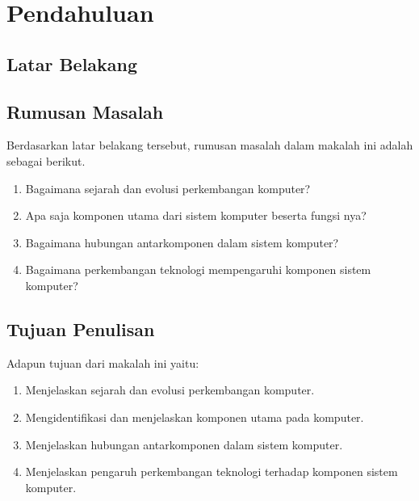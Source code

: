\section{Pendahuluan}

\subsection{Latar Belakang}
\lipsum[1]

\subsection{Rumusan Masalah}
Berdasarkan latar belakang tersebut, rumusan masalah dalam makalah ini adalah sebagai berikut.

\begin{enumerate}
    \item Bagaimana sejarah dan evolusi perkembangan komputer?
    \item Apa saja komponen utama dari sistem komputer beserta fungsi nya?
    \item Bagaimana hubungan antarkomponen dalam sistem komputer?
    \item Bagaimana perkembangan teknologi mempengaruhi komponen sistem komputer?
\end{enumerate}

\subsection{Tujuan Penulisan}
Adapun tujuan dari makalah ini yaitu:

\begin{enumerate}
    \item Menjelaskan sejarah dan evolusi perkembangan komputer.
    \item Mengidentifikasi dan menjelaskan komponen utama pada komputer.
    \item Menjelaskan hubungan antarkomponen dalam sistem komputer.
    \item Menjelaskan pengaruh perkembangan teknologi terhadap komponen sistem komputer.
\end{enumerate}